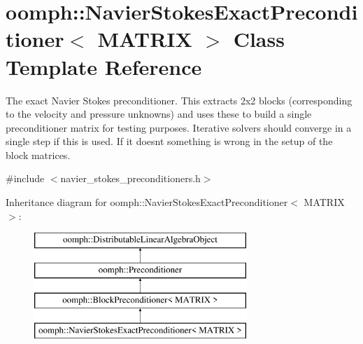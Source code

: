 \hypertarget{classoomph_1_1NavierStokesExactPreconditioner}{}\section{oomph\+:\+:Navier\+Stokes\+Exact\+Preconditioner$<$ M\+A\+T\+R\+IX $>$ Class Template Reference}
\label{classoomph_1_1NavierStokesExactPreconditioner}


The exact Navier Stokes preconditioner. This extracts 2x2 blocks (corresponding to the velocity and pressure unknowns) and uses these to build a single preconditioner matrix for testing purposes. Iterative solvers should converge in a single step if this is used. If it doesn\textquotesingle{}t something is wrong in the setup of the block matrices.  




{\ttfamily \#include $<$navier\+\_\+stokes\+\_\+preconditioners.\+h$>$}

Inheritance diagram for oomph\+:\+:Navier\+Stokes\+Exact\+Preconditioner$<$ M\+A\+T\+R\+IX $>$\+:\begin{figure}[H]
\begin{center}
\leavevmode
\includegraphics[height=4.000000cm]{classoomph_1_1NavierStokesExactPreconditioner}
\end{center}
\end{figure}
